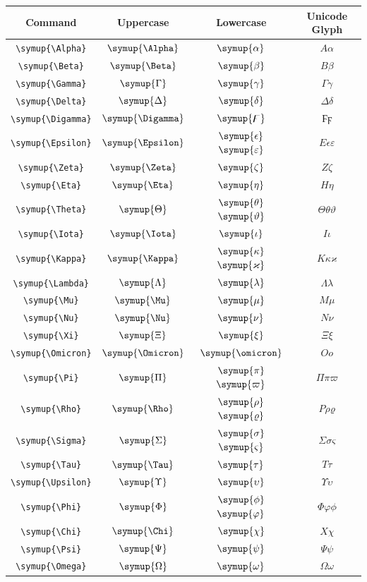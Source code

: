 \documentclass[12pt,a4paper]{article}
\begin{document}
\begin{longtable}{|c|c|c|c|}
\hline
\textbf{Command} & \textbf{Uppercase} & \textbf{Lowercase} & \textbf{Unicode Glyph} \\
\hline
\verb|\symup{\Alpha}| & $\symup{\Alpha}$ & $\symup{\alpha}$ & $ Α α $ \\
\verb|\symup{\Beta}| & $\symup{\Beta}$ & $\symup{\beta}$ & $ Β β $ \\
\verb|\symup{\Gamma}| & $\symup{\Gamma}$ & $\symup{\gamma}$ & $ Γ γ $ \\
\verb|\symup{\Delta}| & $\symup{\Delta}$ & $\symup{\delta}$ & $ Δ δ $ \\
\verb|\symup{\Digamma}| & $\symup{\Digamma}$ & $\symup{\digamma}$ & $ Ϝ ϝ $ \\
\verb|\symup{\Epsilon}| & $\symup{\Epsilon}$ & $\symup{\epsilon}$ $\symup{\varepsilon}$ & $ Ε ϵ ε $ \\
\verb|\symup{\Zeta}| & $\symup{\Zeta}$ & $\symup{\zeta}$ & $ Ζ ζ $ \\
\verb|\symup{\Eta}| & $\symup{\Eta}$ & $\symup{\eta}$ & $ Η η $ \\
\verb|\symup{\Theta}| & $\symup{\Theta}$ & $\symup{\theta}$ $\symup{\vartheta}$ & $ Θ θ ϑ $ \\
\verb|\symup{\Iota}| & $\symup{\Iota}$ & $\symup{\iota}$ & $ Ι ι $ \\
\verb|\symup{\Kappa}| & $\symup{\Kappa}$ & $\symup{\kappa}$ $\symup{\varkappa}$ & $ Κ κ ϰ $ \\
\verb|\symup{\Lambda}| & $\symup{\Lambda}$ & $\symup{\lambda}$ & $ Λ λ $ \\
\verb|\symup{\Mu}| & $\symup{\Mu}$ & $\symup{\mu}$ & $ Μ μ $ \\
\verb|\symup{\Nu}| & $\symup{\Nu}$ & $\symup{\nu}$ & $ Ν ν $ \\
\verb|\symup{\Xi}| & $\symup{\Xi}$ & $\symup{\xi}$ & $ Ξ ξ $ \\
\verb|\symup{\Omicron}| & $\symup{\Omicron}$ & $\symup{\omicron}$ & $ Ο ο $ \\
\verb|\symup{\Pi}| & $\symup{\Pi}$ & $\symup{\pi}$ $\symup{\varpi}$ & $ Π π ϖ $ \\
\verb|\symup{\Rho}| & $\symup{\Rho}$ & $\symup{\rho}$ $\symup{\varrho}$ & $ Ρ ρ ϱ $ \\
\verb|\symup{\Sigma}| & $\symup{\Sigma}$ & $\symup{\sigma}$ $\symup{\varsigma}$ & $ Σ σ ς $ \\
\verb|\symup{\Tau}| & $\symup{\Tau}$ & $\symup{\tau}$ & $ Τ τ $ \\
\verb|\symup{\Upsilon}| & $\symup{\Upsilon}$ & $\symup{\upsilon}$ & $ Υ υ $ \\
\verb|\symup{\Phi}| & $\symup{\Phi}$ & $\symup{\phi}$ $\symup{\varphi}$ & $ Φ φ ϕ $ \\
\verb|\symup{\Chi}| & $\symup{\Chi}$ & $\symup{\chi}$ & $ Χ χ $ \\
\verb|\symup{\Psi}| & $\symup{\Psi}$ & $\symup{\psi}$ & $ Ψ ψ $ \\
\verb|\symup{\Omega}| & $\symup{\Omega}$ & $\symup{\omega}$ & $ Ω ω $ \\
\hline
\end{longtable}
\end{document}
